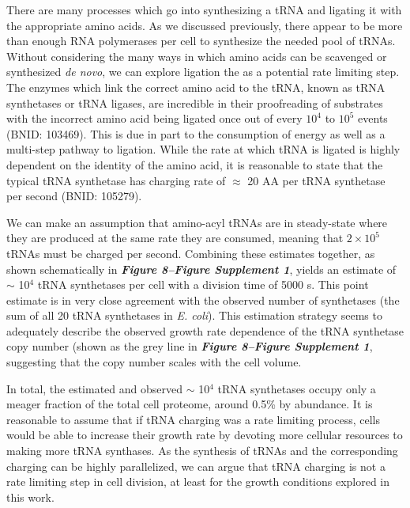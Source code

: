 There are many processes which go into synthesizing a tRNA and ligating it
with the appropriate amino acids. As we discussed previously, there appear to
be more than enough RNA polymerases per cell to synthesize the needed pool of
tRNAs. Without considering the many ways in which amino acids can be
scavenged or synthesized \textit{de novo}, we can explore ligation the as a
potential rate limiting step. The enzymes which link the correct amino acid
to the tRNA, known as tRNA synthetases or tRNA ligases, are incredible in
their proofreading of substrates with the incorrect amino acid being ligated
once out of every $10^4$ to $10^5$ events (BNID: 103469). This is due in part
to the consumption of energy as well as a multi-step pathway to ligation.
While the rate at which tRNA is ligated is highly dependent on the identity
of the amino acid, it is reasonable to state that the typical tRNA synthetase
has charging rate of $\approx$ 20 AA per tRNA synthetase per second (BNID:
105279).

We can make an assumption that amino-acyl tRNAs are in steady-state where
they are produced at the same rate they are consumed, meaning that $2 \times
10^5$ tRNAs must be charged per second. Combining these estimates together,
as shown schematically in \textbf{\textit{Figure 8–Figure Supplement 1}}, yields an estimate of $\sim$ 10$^4$
tRNA synthetases per cell with a division time of 5000 s. This point estimate
is in very close agreement with the observed number of synthetases (the sum
of all 20 tRNA synthetases in \textit{E. coli}). This estimation strategy
seems to adequately describe the observed growth rate dependence of the tRNA
synthetase copy number (shown as the grey line in \textbf{\textit{Figure 8–Figure Supplement 1}}, suggesting
that the copy number scales with the cell volume.

In total, the estimated and observed $\sim$ 10$^4$ tRNA synthetases occupy
only a meager fraction of the total cell proteome, around 0.5\% by abundance.
It is reasonable to assume that if tRNA charging was a rate limiting process,
cells would be able to increase their growth rate by devoting more cellular
resources to making more tRNA synthases. As the synthesis of tRNAs and the
corresponding charging can be highly parallelized, we can argue that tRNA
charging is not a rate limiting step in cell division, at least for the
growth conditions explored in this work.
